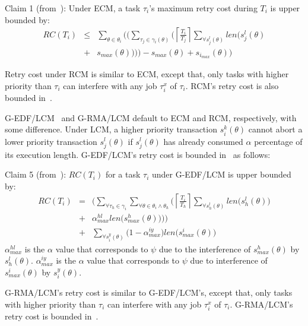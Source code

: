 \documentclass[twocolumn]{article}
\begin{document}
Claim 1 (from~\cite{stmconcurrencycontrol:emsoft11}): Under ECM, a task $\tau_i$'s maximum retry cost during $T_i$ is upper bounded by:
\begin{eqnarray}
RC\left(T_{i}\right) & \le & \sum_{\theta\in\theta_{i}}\Bigg(\Big(\sum_{\tau_{j}\in\gamma_i(\theta)}\Big(\left\lceil\frac{T_{i}}{T_{j}}\right\rceil\sum_{\forall s_{j}^{l}(\theta)}len\big(s_{j}^{l}(\theta)\nonumber \\
 & + & s_{max}(\theta)\big)\Big)\Big)-s_{max}(\theta)+s_{i_{max}}(\theta)\Bigg)\label{eq3}\end{eqnarray}


Retry cost under RCM is similar to ECM, except that, only tasks with higher priority than $\tau_i$ can interfere with any job $\tau_i^x$ of $\tau_i$. RCM's retry cost is also bounded in~\cite{stmconcurrencycontrol:emsoft11}. 

G-EDF/LCM~\cite{lcmdac2012} and G-RMA/LCM default to ECM and RCM, respectively, with some difference. Under LCM, a higher priority transaction $s_i^k(\theta)$ cannot abort a lower priority transaction $s_j^l(\theta)$ if $s_j^l(\theta)$ has already consumed $\alpha$ percentage of its execution length. G-EDF/LCM's retry cost is bounded in~\cite{lcmdac2012} as follows:

Claim 5 (from~\cite{lcmdac2012}): $RC(T_i)$ for a task $\tau_i$ under G-EDF/LCM is upper bounded by:
\begin{eqnarray}
RC(T_i) & = & \Bigg(\sum_{\forall \tau_h \in \gamma_i}\sum_{\forall\theta \in \theta_i \wedge \theta_h}\Bigg(\left\lceil\frac{T_{i}}{T_{h}}\right\rceil\sum_{\forall s_{h}^{l}(\theta)}len\Big(s_{h}^{l}(\theta)\Big)\nonumber\\
& + & \alpha_{max}^{hl}len\Big(s_{max}^{h}(\theta)\Big)\Bigg)\Bigg)\nonumber\\
& + & \sum_{\forall s_{i}^{y}(\theta)}\Big(1-\alpha_{max}^{iy}\Big)len\Big(s_{max}^i(\theta)\Big)  
\label{eq78}\end{eqnarray} 
$\alpha_{max}^{hl}$ is the $\alpha$ value that corresponds to $\psi$ due to the interference of $s_{max}^h(\theta)$ by $s_h^l(\theta)$. $\alpha_{max}^{iy}$ is the $\alpha$ value that corresponds to $\psi$ due to interference of $s_{max}^i(\theta)$ by $s_i^y(\theta)$.

G-RMA/LCM's retry cost is similar to G-EDF/LCM's, except that, only tasks with higher priority than $\tau_i$ can interfere with any job $\tau_i^x$ of $\tau_i$. G-RMA/LCM's retry cost is bounded 
in~\cite{lcmdac2012}.
\end{document}
